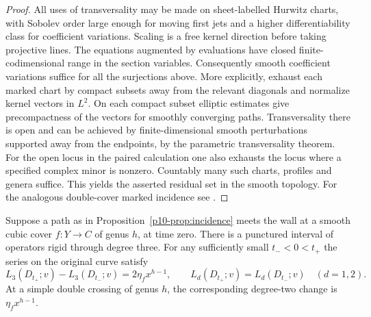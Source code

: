 \begin{proof}
All uses of transversality may be made on sheet-labelled Hurwitz
charts, with Sobolev order large enough for moving first jets and a
higher differentiability class for coefficient variations. Scaling
is a free kernel direction before taking projective lines. The
equations augmented by evaluations have closed finite-codimensional
range in the section variables. Consequently smooth coefficient
variations suffice for all the surjections above. More explicitly,
exhaust each marked chart by compact subsets away from the relevant
diagonals and normalize kernel vectors in $L^2$. On each compact
subset elliptic estimates give precompactness of the vectors for
smoothly converging paths. Transversality there is open and can be
achieved by finite-dimensional smooth perturbations supported away
from the endpoints, by the parametric transversality theorem. For the
open locus in the paired calculation one also exhausts the locus
where a specified complex minor is nonzero. Countably many such
charts, profiles and genera suffice. This yields the asserted residual
set in the smooth topology. For the analogous double-cover marked
incidence see \cite[Lemmas~5.11 and~5.15]{bai}.
\end{proof}

\begin{proposition}\label{p10-prop:smoothjump}
Suppose a path as in Proposition~\ref{p10-prop:incidence} meets the wall
at a smooth cubic cover $f:Y\to C$ of genus $h$, at time zero. There
is a punctured interval of operators rigid through degree three. For
any sufficiently small $t_-<0<t_+$ the series on the original curve
satisfy
\[
 L_3(D_{t_+};v)-L_3(D_{t_-};v)=2\eta_f x^{h-1},
 \qquad
 L_d(D_{t_+};v)=L_d(D_{t_-};v)\quad(d=1,2).
\]
At a simple double crossing of genus $h$, the corresponding
degree-two change is $\eta_f x^{h-1}$.
\end{proposition}


